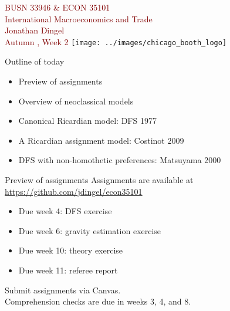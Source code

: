 \documentclass[10pt,notes=hide]{beamer}
\begin{document}
\begin{frame}[plain]
\begin{center}
\large
\textcolor{maroon}{BUSN 33946 \& ECON 35101\\
International Macroeconomics and Trade\\ 
Jonathan Dingel\\
Autumn \the\year, Week 2}
\vfill 
\texttt{[image: ../images/chicago\_booth\_logo]}
\end{center}
\end{frame}
\begin{frame}{Outline of today}
\begin{itemize}
	\item Preview of assignments
	\item Overview of neoclassical models
	\item Canonical Ricardian model: DFS 1977
	\item A Ricardian assignment model: Costinot 2009
	\item DFS with non-homothetic preferences: Matsuyama 2000
\end{itemize}
\end{frame}
\begin{frame}{Preview of assignments}
Assignments are available at \url{https://github.com/jdingel/econ35101}
\begin{itemize}
	\item Due week 4: DFS exercise
	\item Due week 6: gravity estimation exercise
	\item Due week 10: theory exercise
	\item Due week 11: referee report
\end{itemize}
Submit assignments via Canvas.\\
Comprehension checks are due in weeks 3, 4, and 8.
\end{frame}
\end{document}
